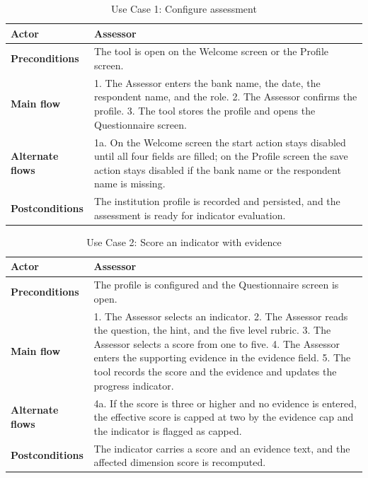 \begin{table}[H]
\centering
\caption{Use Case 1: Configure assessment} \label{tab:uc01}
\begin{tabular}{|p{3cm}|p{12cm}|}
\hline
\textbf{Actor} & Assessor \\
\hline
\textbf{Preconditions} & The tool is open on the Welcome screen or the Profile screen. \\
\hline
\textbf{Main flow} & 1. The Assessor enters the bank name, the date, the respondent name, and the role. 2. The Assessor confirms the profile. 3. The tool stores the profile and opens the Questionnaire screen. \\
\hline
\textbf{Alternate flows} & 1a. On the Welcome screen the start action stays disabled until all four fields are filled; on the Profile screen the save action stays disabled if the bank name or the respondent name is missing. \\
\hline
\textbf{Postconditions} & The institution profile is recorded and persisted, and the assessment is ready for indicator evaluation. \\
\hline
\end{tabular}

\end{table}

\begin{table}[H]
\centering
\caption{Use Case 2: Score an indicator with evidence} \label{tab:uc02}
\begin{tabular}{|p{3cm}|p{12cm}|}
\hline
\textbf{Actor} & Assessor \\
\hline
\textbf{Preconditions} & The profile is configured and the Questionnaire screen is open. \\
\hline
\textbf{Main flow} & 1. The Assessor selects an indicator. 2. The Assessor reads the question, the hint, and the five level rubric. 3. The Assessor selects a score from one to five. 4. The Assessor enters the supporting evidence in the evidence field. 5. The tool records the score and the evidence and updates the progress indicator. \\
\hline
\textbf{Alternate flows} & 4a. If the score is three or higher and no evidence is entered, the effective score is capped at two by the evidence cap and the indicator is flagged as capped. \\
\hline
\textbf{Postconditions} & The indicator carries a score and an evidence text, and the affected dimension score is recomputed. \\
\hline
\end{tabular}

\end{table}

